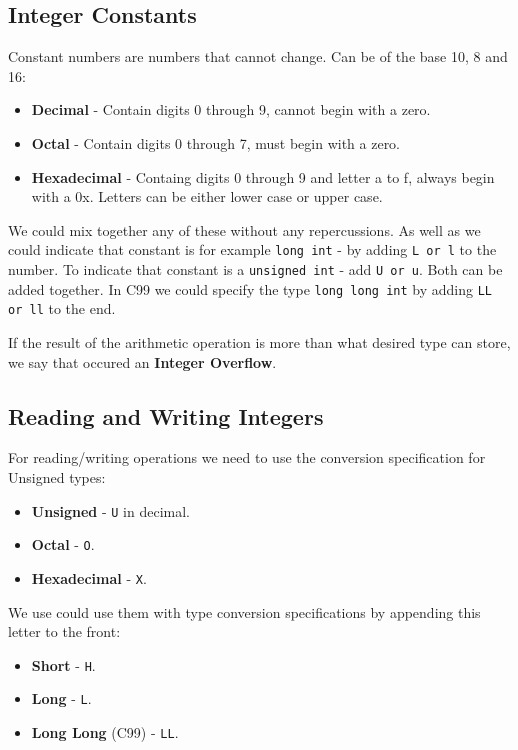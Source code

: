 \documentclass[12pt, openany]{book}
\begin{document}
    \subsection*{Integer Constants}
    Constant numbers are numbers that cannot change. Can be of the base 10, 8 and 16:
    \begin{itemize}
        \item \textbf{Decimal} - Contain digits 0 through 9, cannot begin with a zero.
        \item \textbf{Octal} - Contain digits 0 through 7, must begin with a zero.
        \item \textbf{Hexadecimal} - Containg digits 0 through 9 and letter a to f,
        always begin with a 0x. Letters can be either lower case or upper case.
    \end{itemize}

    We could mix together any of these without any repercussions. As well as we could
    indicate that constant is for example \texttt{long int} - by adding \texttt{L or l}
    to the number. To indicate that constant is a \texttt{unsigned int} -
    add \texttt{U or u}. Both can be added together. In C99 we could specify the type
    \texttt{long long int} by adding \texttt{LL or ll} to the end.

    \bigskip
    If the result of the arithmetic operation is more than what desired type can store,
    we say that occured an \textbf{Integer Overflow}.

    \subsection*{Reading and Writing Integers}
    For reading/writing operations we need to use the conversion specification
    for Unsigned types:
    \begin{itemize}
        \item \textbf{Unsigned} - \texttt{U} in decimal.
        \item \textbf{Octal} - \texttt{O}.
        \item \textbf{Hexadecimal} - \texttt{X}.
    \end{itemize} 
    We use could use them with type conversion specifications by appending this letter
    to the front:
    \begin{itemize}
        \item \textbf{Short} - \texttt{H}.
        \item \textbf{Long} - \texttt{L}.
        \item \textbf{Long Long} (C99) - \texttt{LL}.
    \end{itemize}
\end{document}

